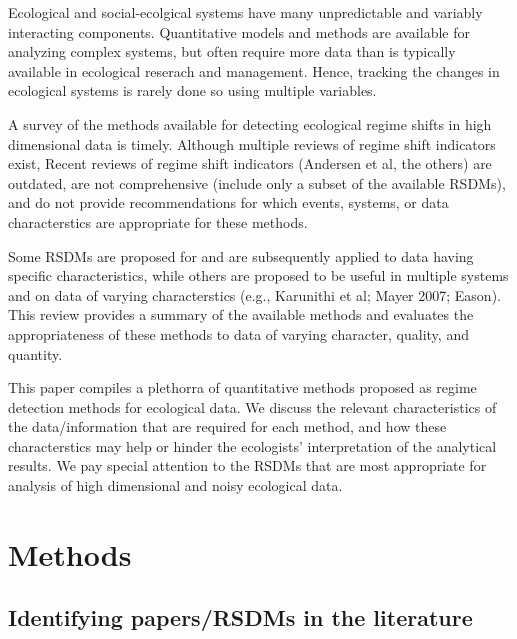 \documentclass[12pt,twoside]{reedthesis}
\begin{document}
Ecological and social-ecolgical systems have many unpredictable and variably interacting components. Quantitative models and methods are available for analyzing complex systems, but often require more data than is typically available in ecological reserach and management. Hence, tracking the changes in ecological systems is rarely done so using multiple variables.

A survey of the methods available for detecting ecological regime shifts in high dimensional data is timely. Although multiple reviews of regime shift indicators exist, Recent reviews of regime shift indicators (Andersen et al, the others) are outdated, are not comprehensive (include only a subset of the available RSDMs), and do not provide recommendations for which events, systems, or data characterstics are appropriate for these methods.

Some RSDMs are proposed for and are subsequently applied to data having specific characteristics, while others are proposed to be useful in multiple systems and on data of varying characterstics (e.g., Karunithi et al; Mayer 2007; Eason). This review provides a summary of the available methods and evaluates the appropriateness of these methods to data of varying character, quality, and quantity.

This paper compiles a plethorra of quantitative methods proposed as regime detection methods for ecological data. We discuss the relevant characteristics of the data/information that are required for each method, and how these characterstics may help or hinder the ecologists' interpretation of the analytical results. We pay special attention to the RSDMs that are most appropriate for analysis of high dimensional and noisy ecological data.

\hypertarget{methods-1}{%
\section{Methods}\label{methods-1}}

\hypertarget{identifying-papersrsdms-in-the-literature}{%
\subsection{Identifying papers/RSDMs in the literature}\label{identifying-papersrsdms-in-the-literature}}
\end{document}
